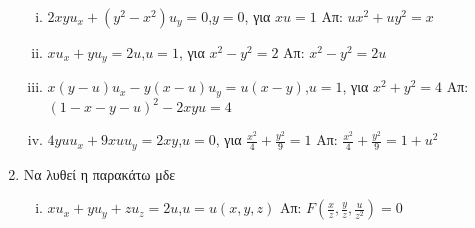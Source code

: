 \begin{enumerate}
\begin{enumerate}[i)]
      \item $2xyu_{x}+(y^{2}-x^{2})u_{y}=0$,\quad $y=0$, για $xu=1$ 
        \hfill Απ: $ux^{2}+uy^{2}=x$
      \item $xu_{x}+yu_{y}=2u$,\quad $u=1$, για $x^{2}-y^{2}=2$ 
        \hfill Απ: $x^{2}-y^{2}=2u$
      \item $x(y-u)u_{x}-y(x-u)u_{y}=u(x-y)$,\quad $u=1$, για $x^{2}+y^{2}=4$ 
        \hfill Απ: $(1-x-y-u)^{2}-2xyu=4$
      \item $4yuu_{x}+9xuu_{y}=2xy$,\quad $u=0$, για $\frac{x^{2}}{4}+\frac{y^{2}}{9}=1$ \hfill Απ: $\frac{x^{2}}{4}+\frac{y^{2}}{9}=1+u^{2}$
    \end{enumerate}

  \item Να λυθεί η παρακάτω μδε
    \begin{enumerate}[i)]
      \item $xu_{x}+yu_{y}+zu_{z}=2u$,\quad $u=u(x,y,z)$ \hfill Απ: $F(\frac{x}{z},\frac{y}{z},\frac{u}{z^{2}})=0$

    \end{enumerate}
\end{enumerate}


